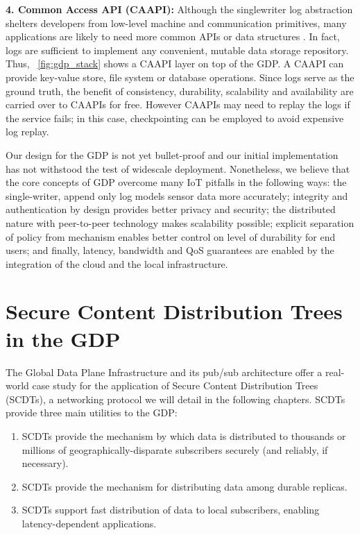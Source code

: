 \textbf{4. Common Access API (CAAPI):} Although the singlewriter
log abstraction shelters developers from low-level
machine and communication primitives, many applications
are likely to need more common APIs or data structures
\cite{tango}. In fact, logs are sufficient to implement any
convenient, mutable data storage repository. Thus, ~\autoref{fig:gdp_stack}
shows a CAAPI layer on top of the GDP. A CAAPI can
provide key-value store, file system or database operations.
Since logs serve as the ground truth, the benefit
of consistency, durability, scalability and availability are
carried over to CAAPIs for free. However CAAPIs may
need to replay the logs if the service fails; in this case,
checkpointing can be employed to avoid expensive log
replay.

Our design for the GDP is not yet bullet-proof and our
initial implementation has not withstood the test of widescale
deployment. Nonetheless, we believe that the
core concepts of GDP overcome many IoT pitfalls in the following ways: the single-writer, append only
log models sensor data more accurately; integrity
and authentication by design provides better privacy and
security; the distributed nature with peer-to-peer technology
makes scalability possible; explicit separation of
policy from mechanism enables better control on level of
durability for end users; and finally, latency, bandwidth
and QoS guarantees are enabled by the integration of the
cloud and the local infrastructure.

\section{Secure Content Distribution Trees in the GDP}
\label{gdp-scdt}
The Global Data Plane Infrastructure and its pub/sub architecture offer a real-world case study for the application of Secure Content Distribution Trees (SCDTs), a networking protocol we will detail in the following chapters. SCDTs provide three main utilities to the GDP:

\begin{enumerate}  
	\item SCDTs provide the mechanism by which data is distributed to thousands or millions of geographically-disparate subscribers securely (and reliably, if necessary).
	\item SCDTs provide the mechanism for distributing data among durable replicas.
	\item SCDTs support fast distribution of data to local subscribers, enabling latency-dependent applications.
\end{enumerate}

